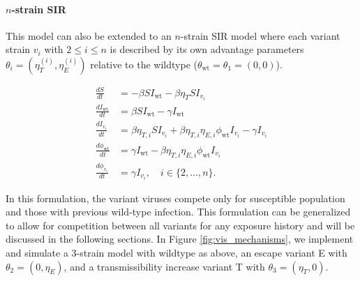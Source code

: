 \documentclass[12pt,oneside,letterpaper]{article}
\newcommand{\wt}{\text{wt}}
\def\tbc#1{\textcolor{purple}{[#1]}}
\begin{document}
\paragraph{$n$-strain SIR}%

This model can also be extended to an $n$-strain SIR model where each variant strain $v_i$ with $2\leq i \leq n$ is described by its own advantage parameters $\theta_{i} = (\eta_{T}^{(i)},\eta_{E}^{(i)})$  relative to the wildtype ($\theta_{\text{wt}} = \theta_{1} = (0, 0)$).

\begin{align*}
    \frac{d S}{d t} &= - \beta S I_{\wt} - \beta \eta_{T} S I_{v_{i}}\\
    \frac{d I_{\wt}}{dt} &= \beta S I_{\wt} - \gamma I_{\wt}\\
    \frac{d I_{v_{i}}}{dt} &= \beta \eta_{T, i} S I_{v_{i}} + \beta \eta_{T, i} \eta_{E, i} \phi_{\wt} I_{v_{i}} - \gamma I_{v_{i}}\\
    \frac{d \phi_{\wt}}{dt} &= \gamma I_{\wt} - \beta \eta_{T, i} \eta_{E, i} \phi_{\wt} I_{v_{i}}\\
    \frac{d \phi_{v_{i}}}{dt} &= \gamma I_{v_{i}}, \quad i \in \{2, \ldots, n\}.
\end{align*}

In this formulation, the variant viruses compete only for susceptible population and those with previous wild-type infection.
This formulation can be generalized to allow for competition between all variants for any exposure history and will be discussed in the following sections.
In Figure \ref{fig:vis_mechanisms}, we implement and simulate a 3-strain model with wildtype as above, an escape variant E with $\theta_{2} = (0, \eta_{E})$, and a transmissibility increase variant T with $\theta_{3} = (\eta_{T}, 0)$.
\end{document}
